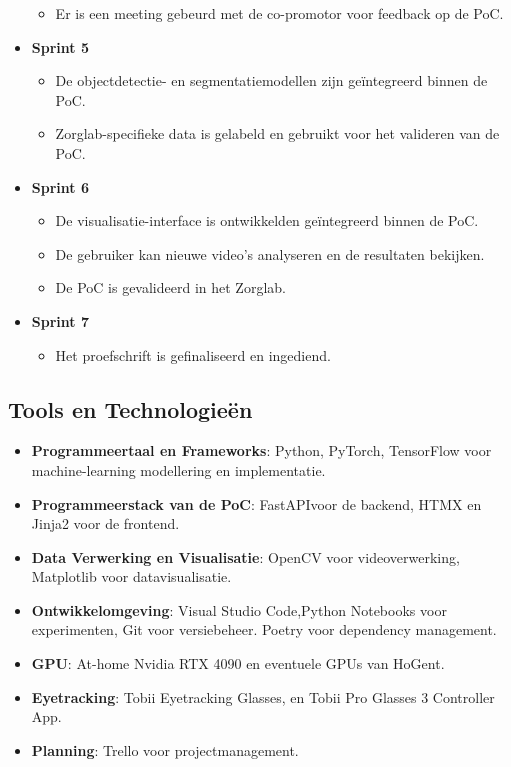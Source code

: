 \begin{itemize}
\begin{itemize}
            \item Er is een meeting gebeurd met de co-promotor voor feedback op de PoC.
        \end{itemize}
    \item \textbf{Sprint 5}
        \begin{itemize}
            \item De objectdetectie- en segmentatiemodellen zijn geïntegreerd binnen de PoC.
            \item Zorglab-specifieke data is gelabeld en gebruikt voor het valideren van de PoC.
        \end{itemize}
    \item \textbf{Sprint 6}
        \begin{itemize}
            \item De visualisatie-interface is ontwikkeld\newline en geïntegreerd binnen de PoC.
            \item De gebruiker kan nieuwe video's analyseren en de resultaten bekijken.
            \item De PoC is gevalideerd in het Zorglab.
        \end{itemize}
    \item \textbf{Sprint 7}
        \begin{itemize}
            \item Het proefschrift is gefinaliseerd en ingediend.
        \end{itemize}
\end{itemize}

\subsection{Tools en Technologieën}

\begin{itemize} 
  \item \textbf{Programmeertaal en Frameworks}: Python, PyTorch, TensorFlow voor\\ machine-learning modellering en implementatie. 
  \item \textbf{Programmeerstack van de PoC}: FastAPI\newline voor de backend, HTMX en Jinja2 voor de frontend.
  \item \textbf{Data Verwerking en Visualisatie}: OpenCV voor videoverwerking, Matplotlib voor datavisualisatie. 
  \item \textbf{Ontwikkelomgeving}: Visual Studio Code,\newline Python Notebooks voor experimenten, Git voor versiebeheer. Poetry voor dependency management.
  \item \textbf{GPU}: At-home Nvidia RTX 4090 en eventuele GPUs van HoGent.
  \item \textbf{Eyetracking}: Tobii Eyetracking Glasses, en Tobii Pro Glasses 3 Controller App.
  \item \textbf{Planning}: Trello voor projectmanagement.
\end{itemize}

